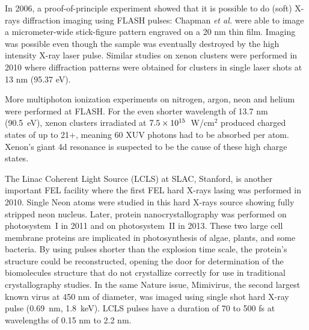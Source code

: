 In 2006, a proof-of-principle experiment showed that it is possible to
do (soft) X-rays diffraction imaging using FLASH pulses\cite{Chapman2006}:
Chapman \textit{et al.} were able to image a micrometer-wide stick-figure pattern
engraved on a 20 nm thin film. Imaging was possible even though the sample was
eventually destroyed by the high intensity X-ray laser pulse.
Similar studies on xenon clusters were performed in 2010\cite{Bostedt2010} where
diffraction patterns were obtained for clusters in single laser shots
at 13 nm (95.37 eV).

More multiphoton
ionization experiments on nitrogen, argon, neon and helium were performed at
FLASH.
For the even shorter wavelength of 13.7 nm (90.5~eV), xenon clusters irradiated at
$\ten{7.5}{15}$~W/cm$^2$ produced charged states of up to 21+\cite{Sorokin2007,Richter2009},
meaning 60 XUV photons had to be absorbed per atom. Xenon's giant 4d
resonance is suspected to be the cause of these high charge states.

The Linac Coherent Light Source (LCLS) at SLAC, Stanford, is another important
FEL facility where the first FEL hard X-rays lasing was
performed in 2010\cite{Emma2010,Schneider2010}. Single Neon atoms were studied in
this hard X-rays source\cite{Young2010} showing fully stripped neon nucleus.
Later, protein nanocrystallography was performed
on photosystem~I in 2011\cite{Chapman2011} and on photosystem~II in
2013\cite{Kern2013}. These two large cell membrane proteins are implicated in
photosynthesis of algae, plants, and some bacteria.
By using pulses shorter
than the explosion time scale, the protein's structure could be reconstructed,
opening the door for determination of the biomolecules structure that
do not crystallize correctly for use in traditional crystallography studies.
In the same Nature issue, Mimivirus, the second largest known virus at 450 nm
of diameter, was imaged using single shot hard X-ray pulse (0.69~nm,
1.8~keV)\cite{Seibert2011}. LCLS pulses have a duration of 70 to 500 fs at
wavelengths of 0.15 nm to 2.2 nm\cite{Pellegrini2011}.

